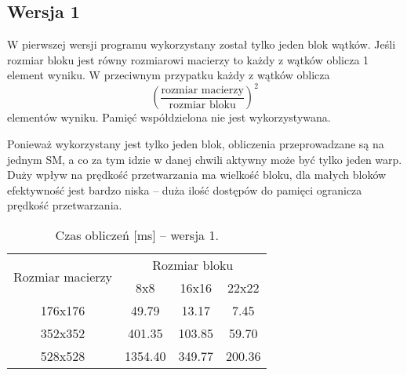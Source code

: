 
\subsection{Wersja 1}

W pierwszej wersji programu wykorzystany został tylko jeden blok wątków. Jeśli rozmiar bloku jest równy rozmiarowi macierzy to każdy z wątków oblicza 1 element wyniku. W przeciwnym przypatku każdy z wątków oblicza $$ {\left(\frac{\text{rozmiar macierzy}}{\text{rozmiar bloku}}\right)}^{2} $$ elementów wyniku. Pamięć współdzielona nie jest wykorzystywana.



Ponieważ wykorzystany jest tylko jeden blok, obliczenia przeprowadzane są na jednym SM, a co za tym idzie w danej chwili aktywny może być tylko jeden warp. \\
Duży wpływ na prędkość przetwarzania ma wielkość bloku, dla małych bloków efektywność jest bardzo niska -- duża ilość dostępów do pamięci ogranicza prędkość przetwarzania.

\begin{table}[H]
\centering
\begin{tabular}{|c|c|c|c|}
\hline
\multirow{2}{*}{Rozmiar macierzy} & \multicolumn{3}{c|}{Rozmiar bloku} \\ \cline{2-4}
& 8x8 & 16x16 & 22x22 \\ \hline
176x176 & 49.79 & 13.17 & 7.45 \\ \hline
352x352 & 401.35 & 103.85 & 59.70 \\ \hline
528x528 & 1354.40 & 349.77 & 200.36 \\ \hline
\end{tabular}
\caption{Czas obliczeń [ms] -- wersja 1.}
\end{table}

